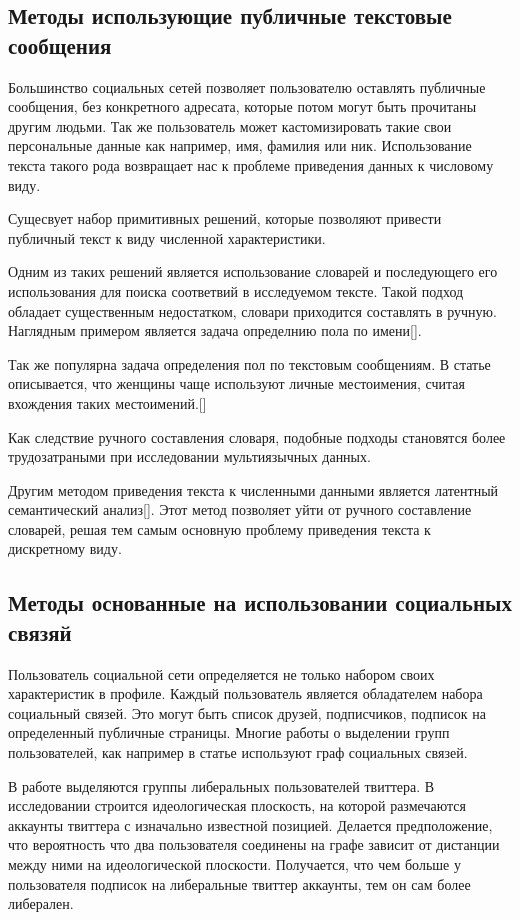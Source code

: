 \documentclass[annotation,times,page4]{itmo-student-thesis}
\begin{document}
\subsection{Методы использующие публичные текстовые сообщения}
Большинство социальных сетей позволяет пользователю оставлять публичные сообщения, без конкретного адресата, которые потом могут быть прочитаны другим людьми. Так же пользователь может кастомизировать такие свои персональные данные как например, имя, фамилия или ник. Использование текста такого рода возвращает нас к проблеме приведения данных к числовому виду.
 
Сущесвует набор примитивных решений, которые позволяют привести публичный текст к виду численной характеристики. 

Одним из таких решений является использование словарей и последующего его использования для поиска соответвий в исследуемом тексте. Такой подход обладает существенным недостатком, словари приходится составлять в ручную. Наглядным примером является задача определнию пола по имени[]. 

Так же популярна задача определения пол по текстовым сообщениям. В статье описывается, что женщины чаще используют личные местоимения, считая вхождения таких местоимений.[]

Как следствие ручного составления словаря, подобные подходы становятся более трудозатраными при исследовании мультиязычных данных.

Другим методом приведения текста к численными данными является латентный семантический анализ[]. Этот метод позволяет уйти от ручного составление словарей, решая тем самым основную проблему приведения текста к дискретному виду.
  
\subsection{Методы основанные на использовании социальных связяй}
Пользователь социальной сети определяется не только набором своих характеристик в профиле. Каждый пользователь является обладателем набора социальный связей. Это могут быть список друзей, подписчиков, подписок на определенный публичные страницы. Многие работы о выделении групп пользователей, как например в статье используют граф социальных связей.

В работе выделяются группы либеральных пользователей твиттера. В исследовании строится идеологическая плоскость, на которой размечаются аккаунты твиттера с изначально известной позицией. Делается предположение, что вероятность что два пользователя соединены на графе зависит от дистанции между ними на идеологической плоскости. Получается, что чем больше у пользователя подписок на либеральные твиттер аккаунты, тем он сам более либерален.
\end{document}
